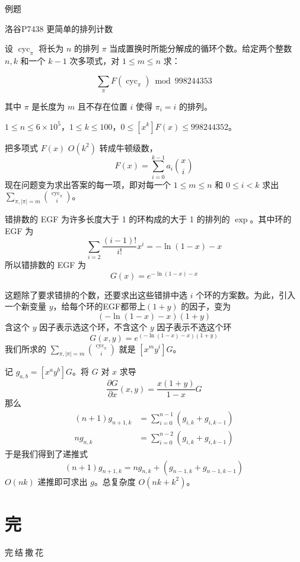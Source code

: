 \documentclass[UTF8]{beamer}
\begin{document}
    \begin{frame}{例题}
        \begin{block}{洛谷P7438 更简单的排列计数}

        设 $\operatorname{cyc}_\pi$ 将长为 $n$ 的排列 $\pi$ 当成置换时所能分解成的循环个数。给定两个整数 $n,k$ 和一个 $k-1$ 次多项式，对 $1\leq m\leq n$ 求：

        $$
        \sum\limits_{\pi}F(\operatorname{cyc}_{\pi})\bmod 998244353
        $$

        其中 $\pi$ 是长度为 $m$ 且不存在位置 $i$ 使得 $\pi_i=i$ 的排列。


        $1\leq n\leq 6\times 10^5$，$1\leq k\leq 100$，$0\leq [x^k]F(x)\leq 998244352$。
        \end{block}
        \pause

        
        把多项式 $F(x)$ $O(k^2)$ 转成牛顿级数，
        $$
        F(x)=\sum_{i=0}^{k-1}a_i\binom{x}{i}
        $$
        现在问题变为求出答案的每一项，即对每一个 $1\le m\le n$ 和 $0\le i< k$ 求出 $\sum_{\pi,|\pi|=m}\binom{\operatorname{cyc}_{\pi}}{i}$。
    \end{frame}

    \begin{frame}
        错排数的 EGF 为许多长度大于 1 的环构成的大于 1 的排列的 $\exp$。其中环的 EGF 为
        $$
        \sum_{i=2} \frac{(i-1)!}{i!}x^i = -\ln (1-x)-x
        $$
        所以错排数的 EGF 为
        $$
        G(x)=e^{-\ln (1-x)-x}
        $$

        \pause
        这题除了要求错排的个数，还要求出这些错排中选 $i$ 个环的方案数。为此，引入一个新变量 $y$，给每个环的EGF都带上$(1+y)$ 的因子，变为
        $$
        (-\ln (1-x)-x)(1+y)
        $$
        含这个 $y$ 因子表示选这个环，不含这个 $y$ 因子表示不选这个环
        $$
        G(x,y)=e^{(-\ln (1-x)-x)(1+y)}
        $$
        我们所求的 $\sum_{\pi,|\pi|=m}\binom{\operatorname{cyc}_{\pi}}{i}$ 就是 $[x^my^i]G$。
    \end{frame}

    \begin{frame}
        记 $g_{a,b} = [x^ay^b]G$。将 $G$ 对 $x$ 求导
        $$
        \frac{\partial G}{\partial x}(x,y) = \frac{x(1+y)}{1-x}G
        $$
        那么
        $$
        \begin{aligned}
        (n+1)g_{n+1,k} &= \sum_{i=0}^{n-1}(g_{i,k}+g_{i,k-1})\\
        ng_{n,k}&=\sum_{i=0}^{n-2}(g_{i,k}+g_{i,k-1})
        \end{aligned}
        $$
        于是我们得到了递推式
        $$
        (n+1)g_{n+1,k} = ng_{n,k} + (g_{n-1,k}+g_{n-1,k-1})
        $$
        $O(nk)$ 递推即可求出 $g$。总复杂度 $O(nk+k^2)$。
    \end{frame}

    \section{完}
	\begin{frame}
		\begin{center}
			\begin{Huge}
				完$\ $结$\ $撒$\ $花\\
			\end{Huge}
		\end{center}
	\end{frame}
\end{document}
